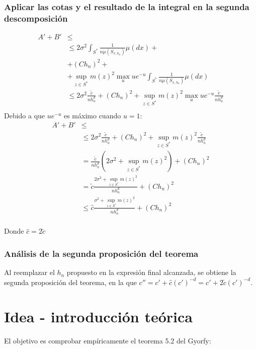 \documentclass[12pt, a4paper]{article}
\begin{document}
\subsubsection{Aplicar las cotas y el resultado de la integral en la segunda descomposición}
$$
\begin{aligned}
A' + B' &\leq \\
&\leq 2 \sigma^2 \int_{S^{*}} \frac{1}{n\mu(S_{x,h_n})}\mu(dx) +\\&+
(C h_n)^2 
+\\&+
\mathop{sup}_{z \in S^{*}} m(z)^2 \mathop{max}_u ue^{-u} \int_{S^{*}} \frac{1}{n\mu(S_{x,h_n})} \mu(dx) \\
&\leq 2 \sigma^2\frac{\tilde{c}}{nh_n^d} +
(C h_n)^2 
+
\mathop{sup}_{z \in S^{*}} m(z)^2 \mathop{max}_u ue^{-u} \frac{\tilde{c}}{nh_n^d} \\
\end{aligned}
$$
Debido a que $ue^{-u}$ es máximo cuando $u=1$:
$$
\begin{aligned}
A' + B' &\leq \\
&\leq 2 \sigma^2 \frac{\tilde{c}}{nh_n^d} +
(C h_n)^2 
+
\mathop{sup}_{z \in S^{*}} m(z)^2 \frac{\tilde{c}}{nh_n^d} \\
&= \frac{\tilde{c}}{nh_n^d} (2 \sigma^2 +
\mathop{sup}_{z \in S^{*}} m(z)^2)  + (C h_n)^2 \\
&= \tilde{c} \frac{2 \sigma^2 +
\mathop{sup}_{z \in S^{*}} m(z)^2}{nh_n^d}  + (C h_n)^2 \\
&\leq \hat{c} \frac{\sigma^2 +
\mathop{sup}_{z \in S^{*}} m(z)^2}{nh_n^d}  + (C h_n)^2 \\
\end{aligned}
$$

Donde $\hat{c}=2\tilde{c}$ 

\subsubsection{Análisis de la segunda proposición del teorema}
Al reemplazar el $h_n$ propuesto en la expresión final alcanzada, se obtiene la segunda proposición del teorema, en la que $c''=c'+\hat{c}(c')^{-d}=c'+2\tilde{c}(c')^{-d}$.

\section{Idea - introducción teórica}
El objetivo es comprobar empíricamente el teorema 5.2 del Gyorfy:
\end{document}
